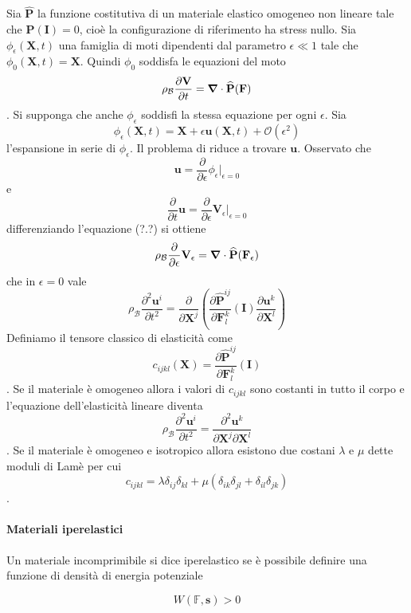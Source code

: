 Sia $\widehat{\mathbf{P}}$ la funzione costitutiva di un materiale elastico omogeneo non lineare tale che $\widehat{\mathbf{P}}(\mathbf{I})=0$, cioè la configurazione di riferimento ha stress nullo.
Sia $\phi_\epsilon(\mathbf{X},t)$ una famiglia di moti dipendenti dal parametro $\epsilon \ll1$ tale che $\phi_0(\mathbf{X},t) = \mathbf{X}$. Quindi $\phi_0$ soddisfa le equazioni del moto
$$\rho_\mathcal{B}\frac{\partial \mathbf{V}}{\partial t} = \boldsymbol{\nabla}\cdot\widehat{\mathbf{P}}(\mathbf{F}) $$.
Si supponga che anche $\phi_\epsilon$ soddisfi la stessa equazione per ogni $\epsilon$.
Sia 
$$\phi_\epsilon(\mathbf{X},t) = \mathbf{X}+\epsilon\mathbf{u}(\mathbf{X},t) + \mathcal{O}(\epsilon^2)$$
l'espansione in serie di $\phi_\epsilon$.
Il problema di riduce a trovare $\mathbf{u}$.
Osservato che 
$$\mathbf{u}=\frac{\partial}{\partial \epsilon}\phi_\epsilon \big|_{\epsilon=0}$$
e
$$\frac{\partial}{\partial t}\mathbf{u}=\frac{\partial}{\partial \epsilon}\mathbf{V}_\epsilon \big|_{\epsilon=0}$$
differenziando l'equazione (?.?) si ottiene
$$\rho_{\mathcal{B}} \frac{\partial}{\partial \epsilon}\mathbf{V}_\epsilon = \boldsymbol{\nabla}\cdot\widehat{\mathbf{P}}(\mathbf{F_\epsilon)}$$
che in $\epsilon=0$ vale
$$\rho_{\mathcal{B}} \frac{\partial^2\mathbf{u}^i}{\partial t^2} = \frac{\partial}{\partial \mathbf{X}^j}(\frac{\partial\widehat{\mathbf{P}}^{ij}}{\partial\mathbf{F}^k_l}(\mathbf{I})\frac{\partial\mathbf{u}^k}{\partial\mathbf{X}^l})$$
Definiamo il tensore classico di elasticità come
$$ c_{ijkl}(\mathbf{X})= \frac{\partial\widehat{\mathbf{P}}^{ij}}{\partial\mathbf{F}^k_l}(\mathbf{I})$$.
Se il materiale è omogeneo allora i valori di $c_{ijkl}$ sono costanti in tutto il corpo e l'equazione dell'elasticità lineare diventa
$$\rho_{\mathcal{B}} \frac{\partial^2\mathbf{u}^i}{\partial t^2} = \frac{\partial^2\mathbf{u}^k}{\partial\mathbf{X}^j\partial\mathbf{X}^l}$$.
Se il materiale è omogeneo e isotropico allora esistono due costani $\lambda$ e $\mu$ dette moduli di Lamè per cui
$$c_{ijkl}=\lambda\delta_{ij}\delta_{kl}+\mu(\delta_{ik}\delta_{jl}+\delta_{il}\delta_{jk})$$.

%
\paragraph{Materiali iperelastici}

Un materiale incomprimibile si dice iperelastico se è possibile definire una funzione di densità di energia potenziale

\begin{equation*}
W(\mathbb{F},\mathbf{s}) > 0
\end{equation*}

